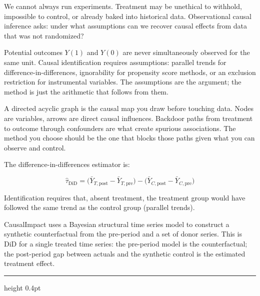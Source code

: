 \documentclass[12pt,a4paper]{article}
\begin{document}
We cannot always run experiments. Treatment may be unethical to withhold,
impossible to control, or already baked into historical data. Observational
causal inference asks: under what assumptions can we recover causal effects
from data that was not randomized?

\begin{concept}
Potential outcomes $Y(1)$ and $Y(0)$ are never simultaneously observed for
the same unit. Causal identification requires assumptions: parallel trends
for difference-in-differences, ignorability for propensity score methods,
or an exclusion restriction for instrumental variables. The assumptions are
the argument; the method is just the arithmetic that follows from them.
\end{concept}

\begin{analogy}
A directed acyclic graph is the causal map you draw before touching data.
Nodes are variables, arrows are direct causal influences. Backdoor paths
from treatment to outcome through confounders are what create spurious
associations. The method you choose should be the one that blocks those
paths given what you can observe and control.
\end{analogy}

The difference-in-differences estimator is:

\begin{equation*}
  \hat\tau_{\mathrm{DiD}}
  = \bigl(\bar{Y}_{T,\text{post}} - \bar{Y}_{T,\text{pre}}\bigr)
  - \bigl(\bar{Y}_{C,\text{post}} - \bar{Y}_{C,\text{pre}}\bigr)
\end{equation*}

Identification requires that, absent treatment, the treatment group would
have followed the same trend as the control group (parallel trends).

\begin{mentalmodel}
CausalImpact uses a Bayesian structural time series model to construct a
synthetic counterfactual from the pre-period and a set of donor series.
This is DiD for a single treated time series: the pre-period model is the
counterfactual; the post-period gap between actuals and the synthetic
control is the estimated treatment effect.
\end{mentalmodel}

\vspace{10pt}\hrule height 0.4pt\vspace{14pt}

\end{document}
